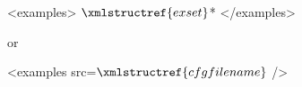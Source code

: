 <examples>
  $\xmlstructref{exset}$*
</examples>

or

<examples src=$\xmlstructref{cfgfilename}$ />


